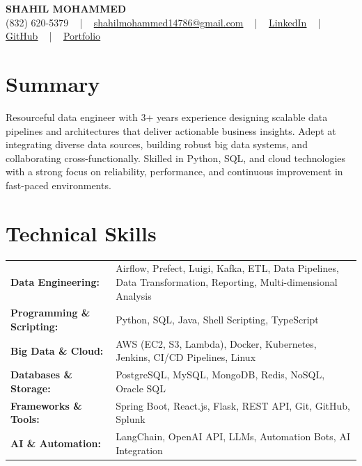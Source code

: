 \documentclass[letterpaper,11pt]{article}
\begin{document}
\begin{center}
    {\fontsize{14pt}{12pt}\selectfont \textbf{\MakeUppercase{Shahil Mohammed}}}\\ \vspace{2pt}
    \fontsize{10pt}{12pt}\selectfont (832) 620-5379 ~ | ~ \href{mailto:shahilmohammed14786@gmail.com}{shahilmohammed14786@gmail.com} ~ | ~  
    \href{https://www.linkedin.com/in/shahil-mohammed-9652931a1/}{\color{blue}\underline{LinkedIn}}  ~ | ~ 
    \href{https://github.com/freakbeast14}{\color{blue}\underline{GitHub}} ~ | ~ 
    \href{https://shahil-mohammed.netlify.app/}{\color{blue}\underline{Portfolio}}
    \vspace{-8pt}
\end{center}

\section{Summary}
\fontsize{9pt}{10pt}\selectfont
Resourceful data engineer with 3+ years experience designing scalable data pipelines and architectures that deliver actionable business insights. Adept at integrating diverse data sources, building robust big data systems, and collaborating cross-functionally. Skilled in Python, SQL, and cloud technologies with a strong focus on reliability, performance, and continuous improvement in fast-paced environments.
 \vspace{-5pt}
 
\section{Technical Skills}
        \vspace{-14pt}
        \begin{table}[h]
            \fontsize{9pt}{10pt}\selectfont
            \begin{tabular}{p{0.3\linewidth} p{0.7\linewidth}}
                \textbf{Data Engineering:} & Airflow, Prefect, Luigi, Kafka, ETL, Data Pipelines, Data Transformation, Reporting, Multi-dimensional Analysis \\
                \textbf{Programming \& Scripting:} & Python, SQL, Java, Shell Scripting, TypeScript \\
                \textbf{Big Data \& Cloud:} & AWS (EC2, S3, Lambda), Docker, Kubernetes, Jenkins, CI/CD Pipelines, Linux \\
                \textbf{Databases \& Storage:} & PostgreSQL, MySQL, MongoDB, Redis, NoSQL, Oracle SQL \\
                \textbf{Frameworks \& Tools:} & Spring Boot, React.js, Flask, REST API, Git, GitHub, Splunk \\
                \textbf{AI \& Automation:} & LangChain, OpenAI API, LLMs, Automation Bots, AI Integration \\
            \end{tabular}
        \end{table}
 \vspace{-15pt}
 
\end{document}
